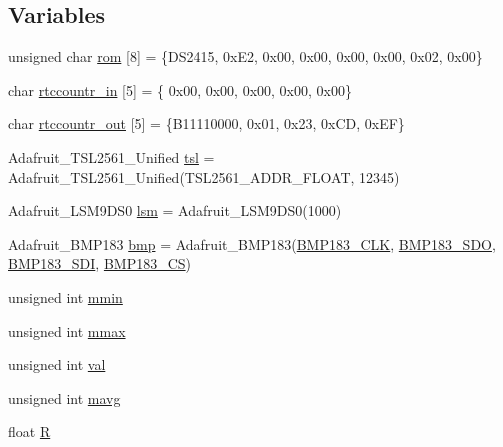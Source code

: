 \subsection*{Variables}
\begin{DoxyCompactItemize}
\item 
unsigned char \hyperlink{OWGeneric__SensorStation_8ino_a8beb78e2b3f2cb6e34f34861a875ca0b}{rom} \mbox{[}8\mbox{]} = \{D\-S2415, 0x\-E2, 0x00, 0x00, 0x00, 0x00, 0x02, 0x00\}
\item 
char \hyperlink{OWGeneric__SensorStation_8ino_a81a94fdcf5fd0721c26e50dd4cd32b1e}{rtccountr\-\_\-in} \mbox{[}5\mbox{]} = \{ 0x00, 0x00, 0x00, 0x00, 0x00\}
\item 
char \hyperlink{OWGeneric__SensorStation_8ino_ac150db4005f4bac8510f9e697f1c291a}{rtccountr\-\_\-out} \mbox{[}5\mbox{]} = \{B11110000, 0x01, 0x23, 0x\-C\-D, 0x\-E\-F\}
\item 
Adafruit\-\_\-\-T\-S\-L2561\-\_\-\-Unified \hyperlink{OWGeneric__SensorStation_8ino_a34dc1ffbb166b7afbf402f717b871f77}{tsl} = Adafruit\-\_\-\-T\-S\-L2561\-\_\-\-Unified(T\-S\-L2561\-\_\-\-A\-D\-D\-R\-\_\-\-F\-L\-O\-A\-T, 12345)
\item 
Adafruit\-\_\-\-L\-S\-M9\-D\-S0 \hyperlink{OWGeneric__SensorStation_8ino_a71a3604f36c6158d823f6ff290ae9f33}{lsm} = Adafruit\-\_\-\-L\-S\-M9\-D\-S0(1000)
\item 
Adafruit\-\_\-\-B\-M\-P183 \hyperlink{OWGeneric__SensorStation_8ino_a6336d5c8f5738cddca3c87581145067b}{bmp} = Adafruit\-\_\-\-B\-M\-P183(\hyperlink{OWGeneric__SensorStation_8ino_a65321e8415f3d7eaec3b1889ae61842f}{B\-M\-P183\-\_\-\-C\-L\-K}, \hyperlink{OWGeneric__SensorStation_8ino_a125fbe56052c13ea3123006b461575bc}{B\-M\-P183\-\_\-\-S\-D\-O}, \hyperlink{OWGeneric__SensorStation_8ino_a1bf5748a363336a822dfec5c86a39a05}{B\-M\-P183\-\_\-\-S\-D\-I}, \hyperlink{OWGeneric__SensorStation_8ino_a66fd4cc54157850a2297eb5d47456bd1}{B\-M\-P183\-\_\-\-C\-S})
\item 
unsigned int \hyperlink{OWGeneric__SensorStation_8ino_a46d2773d075382821ba5cc9724036ef6}{mmin}
\item 
unsigned int \hyperlink{OWGeneric__SensorStation_8ino_ac3c625f389082ca7f017934b3508462d}{mmax}
\item 
unsigned int \hyperlink{OWGeneric__SensorStation_8ino_a9163138d612480a614fa98c44e4318c4}{val}
\item 
unsigned int \hyperlink{OWGeneric__SensorStation_8ino_ad54903c3e759902a4089ee088aedb4a6}{mavg}
\item 
float \hyperlink{OWGeneric__SensorStation_8ino_a4c4b08e61e92b3da1ed512f4e006f34a}{R}

\end{DoxyCompactItemize}
